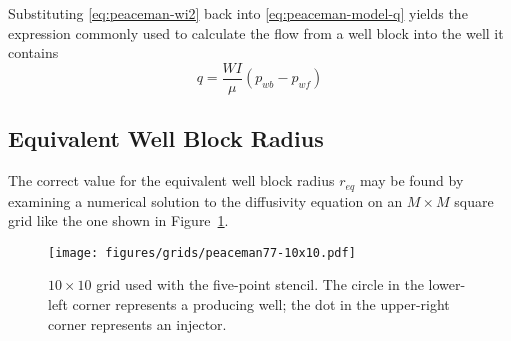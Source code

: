 Substituting \eqref{eq:peaceman-wi2} back into \eqref{eq:peaceman-model-q} yields the expression commonly used to calculate the flow from a well block into the well it contains
\begin{equation}
    q = \frac{WI}{\mu} \left( p_{wb} - p_{wf} \right)
\end{equation}







\subsection{Equivalent Well Block Radius} %
\label{sub:equivalent_wellblock_radius}
The correct value for the equivalent well block radius $r_{eq}$ may be found by examining a numerical solution to the diffusivity equation on an $M\times M$ square grid like the one shown in Figure~\ref{fig:peaceman-grid}.

\begin{figure}[htb]
    \centering
    \texttt{[image: figures/grids/peaceman77-10x10.pdf]}
    \caption{$10\times 10$ grid used with the five-point stencil. The circle in the lower-left corner represents a producing well; the dot in the upper-right corner represents an injector.}
    \label{fig:peaceman-grid}
\end{figure}



